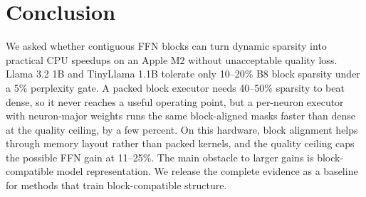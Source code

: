 \section{Conclusion}

We asked whether contiguous FFN blocks can turn dynamic sparsity into
practical CPU speedups on an Apple M2 without unacceptable quality loss.
Llama 3.2 1B and TinyLlama 1.1B tolerate only 10--20\% B8 block sparsity under
a 5\% perplexity gate. A packed block executor needs 40--50\% sparsity to beat
dense, so it never reaches a useful operating point, but a per-neuron executor
with neuron-major weights runs the same block-aligned masks faster than dense
at the quality ceiling, by a few percent. On this hardware, block alignment
helps through memory layout rather than packed kernels, and the quality
ceiling caps the possible FFN gain at 11--25\%. The main obstacle to larger
gains is block-compatible model representation. We release the complete
evidence as a baseline for methods that train block-compatible structure.
